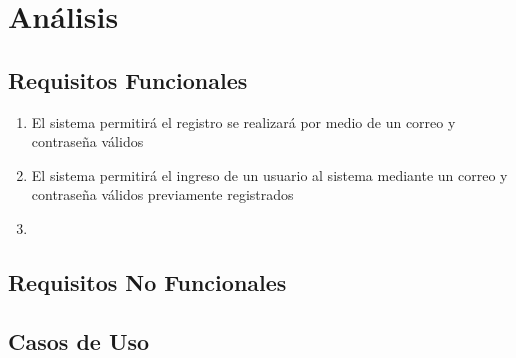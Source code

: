 \documentclass{article}
\begin{document}
\section{Análisis}
\subsection{Requisitos Funcionales}
\begin{enumerate}
\item {El sistema permitirá el registro se realizará por medio de un correo y contraseña válidos}
\item{El sistema permitirá el ingreso de un usuario al sistema mediante un correo y contraseña válidos previamente registrados}
\item {}
\end{enumerate}
\subsection{Requisitos No Funcionales}
\subsection{Casos de Uso}
\end{document}
